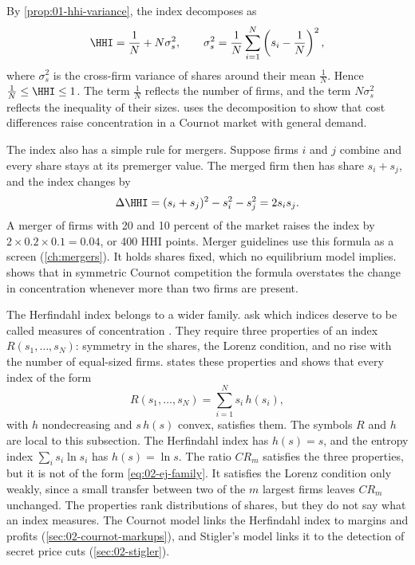 By \cref{prop:01-hhi-variance}, the index decomposes as
\[
  \HHI = \frac{1}{N} + N\sigma_s^2, \qquad \sigma_s^2 = \frac{1}{N}\sum_{i=1}^N \left(s_i - \frac{1}{N}\right)^2,
\]
where $\sigma_s^2$ is the cross-firm variance of shares around their mean $\frac{1}{N}$. Hence
$\frac{1}{N} \le \HHI \le 1$. The term $\frac{1}{N}$ reflects the number of firms, and the term $N\sigma_s^2$
reflects the inequality of their sizes.  uses the decomposition to show that cost
differences raise concentration in a Cournot market with general demand.

The index also has a simple rule for mergers. Suppose firms $i$ and $j$ combine and every share stays at its
premerger value. The merged firm then has share $s_i + s_j$, and the index changes by
\begin{equation}\label{eq:02-delta-hhi}
  \Delta\HHI = (s_i + s_j)^2 - s_i^2 - s_j^2 = 2s_is_j .
\end{equation}
A merger of firms with 20 and 10 percent of the market raises the index by $2 \times 0.2 \times 0.1 = 0.04$, or
400 HHI points. Merger guidelines use this formula as a screen (\cref{ch:mergers}). It holds shares fixed, which no
equilibrium model implies.  shows that in symmetric Cournot competition the formula
overstates the change in concentration whenever more than two firms are present.

The Herfindahl index belongs to a wider family. \citet{EncaouaJacquemin1980} ask which indices deserve to be called
measures of concentration \citep[sec.~5.5]{Tirole1988}. They require three properties of an index
$R(s_1, \dots, s_N)$: symmetry in the shares, the Lorenz condition, and no rise with the number of equal-sized
firms.  states these properties and shows that every index of the form
\begin{equation}\label{eq:02-ej-family}
  R(s_1, \dots, s_N) = \sum_{i=1}^N s_i\, h(s_i),
\end{equation}
with $h$ nondecreasing and $s\, h(s)$ convex, satisfies them. The symbols $R$ and $h$ are local to this subsection.
The Herfindahl index has $h(s) = s$, and the entropy index $\sum_i s_i\ln s_i$ has $h(s) = \ln s$. The ratio
$\mathit{CR}_m$ satisfies the three properties, but it is not of the form \eqref{eq:02-ej-family}. It satisfies the
Lorenz condition only weakly, since a small transfer between two of the $m$ largest firms leaves $\mathit{CR}_m$
unchanged. The properties rank distributions of shares, but they do not say what an index measures. The Cournot
model links the Herfindahl index to margins and profits (\cref{sec:02-cournot-markups}), and Stigler's model links
it to the detection of secret price cuts (\cref{sec:02-stigler}).

